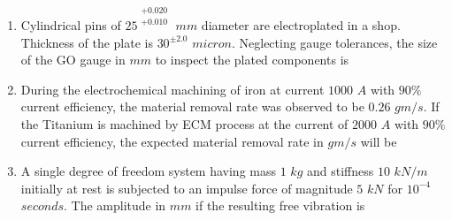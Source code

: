 \documentclass[journal,12pt,onecolumn]{IEEEtran}
\theoremstyle{remark}
\begin{document}
\begin{enumerate}
\hfill{}
\begin{enumerate}
\end{enumerate}

\item Cylindrical pins of $25^{\substack{+0.020\\+0.010}}$ $mm$ diameter are electroplated in a shop. Thickness of the plate is $30^{\pm 2.0}$ $micron$. Neglecting gauge tolerances, the size of the GO gauge in $mm$ to inspect the plated components is 

\hfill{}
\begin{enumerate}
\end{enumerate}

\item During the electrochemical machining  of iron  at current $1000$ $A$ with $90\%$ current efficiency, the material removal rate was observed to be $0.26$ $gm/s$. If the Titanium  is machined by ECM process at the current of $2000$ $A$ with $90\%$ current efficiency, the expected material removal rate in $gm/s$ will be

\hfill{}
\begin{enumerate}
\end{enumerate}

\item A single degree of freedom system having mass $1$ $kg$ and stiffness $10$ $kN/m$ initially at rest is subjected to an impulse force of magnitude $5$ $kN$ for $10^{-4}$ $seconds$. The amplitude in $mm$ if the resulting free vibration is

\hfill{}
\begin{enumerate}
\end{enumerate}

\end{enumerate}
\end{document}

